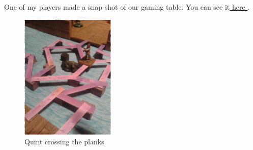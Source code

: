One of my players made a snap shot of our gaming table. You can see it\hyperref[fig:Quint-crossing-the-planks-409036840]{ here } . \\

\begin{figure}[h]
	\centering
	\includegraphics[width=0.4\textwidth]{images/Quint-crossing-the-planks-409036840_mod.jpg}
	\caption{Quint crossing the planks}
	\label{fig:Quint-crossing-the-planks-409036840}
\end{figure}

